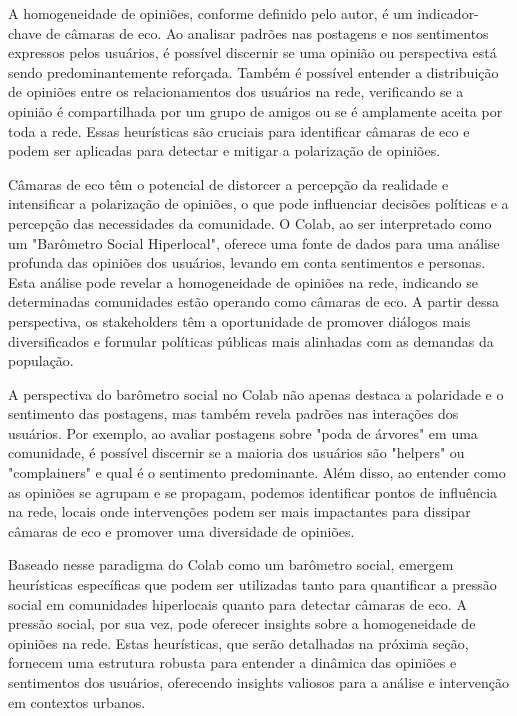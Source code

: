 A homogeneidade de opiniões, conforme definido pelo autor, é um indicador-chave de câmaras de eco. Ao analisar padrões nas postagens e nos sentimentos expressos pelos usuários, é possível discernir se uma opinião ou perspectiva está sendo predominantemente reforçada. Também é possível entender a distribuição de opiniões entre os relacionamentos dos usuários na rede, verificando se a opinião é compartilhada por um grupo de amigos ou se é amplamente aceita por toda a rede. Essas heurísticas são cruciais para identificar câmaras de eco e podem ser aplicadas para detectar e mitigar a polarização de opiniões.

Câmaras de eco têm o potencial de distorcer a percepção da realidade e intensificar a polarização de opiniões, o que pode influenciar decisões políticas e a percepção das necessidades da comunidade. O Colab, ao ser interpretado como um "Barômetro Social Hiperlocal", oferece uma fonte de dados para uma análise profunda das opiniões dos usuários, levando em conta sentimentos e personas. Esta análise pode revelar a homogeneidade de opiniões na rede, indicando se determinadas comunidades estão operando como câmaras de eco. A partir dessa perspectiva, os stakeholders têm a oportunidade de promover diálogos mais diversificados e formular políticas públicas mais alinhadas com as demandas da população.

A perspectiva do barômetro social no Colab não apenas destaca a polaridade e o sentimento das postagens, mas também revela padrões nas interações dos usuários. Por exemplo, ao avaliar postagens sobre "poda de árvores" em uma comunidade, é possível discernir se a maioria dos usuários são "helpers" ou "complainers" e qual é o sentimento predominante. Além disso, ao entender como as opiniões se agrupam e se propagam, podemos identificar pontos de influência na rede, locais onde intervenções podem ser mais impactantes para dissipar câmaras de eco e promover uma diversidade de opiniões.

Baseado nesse paradigma do Colab como um barômetro social, emergem heurísticas específicas que podem ser utilizadas tanto para quantificar a pressão social em comunidades hiperlocais quanto para detectar câmaras de eco. A pressão social, por sua vez, pode oferecer insights sobre a homogeneidade de opiniões na rede. Estas heurísticas, que serão detalhadas na próxima seção, fornecem uma estrutura robusta para entender a dinâmica das opiniões e sentimentos dos usuários, oferecendo insights valiosos para a análise e intervenção em contextos urbanos.

